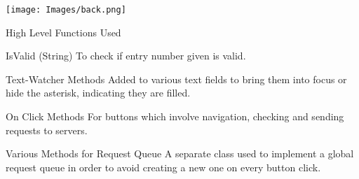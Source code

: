 \documentclass{beamer}
\begin{document}
{\usebackgroundtemplate%
{\texttt{[image: Images/back.png]}}

\begin{frame}{High Level Functions Used }
\begin{block}{IsValid (String)}
To check if entry number given is valid.
\end{block}
\begin{block}{Text-Watcher Methods}
Added to various text fields to bring them into focus or hide the asterisk, indicating they are filled.
\end{block}
\begin{block}{On Click Methods}
For buttons which involve navigation, checking and sending requests to servers.
\end{block}
\begin{block}{Various Methods for Request Queue}
A separate class used to implement a global request queue in order to avoid creating a new one on every button click.
\end{block}


\end{frame}
}
\end{document}
